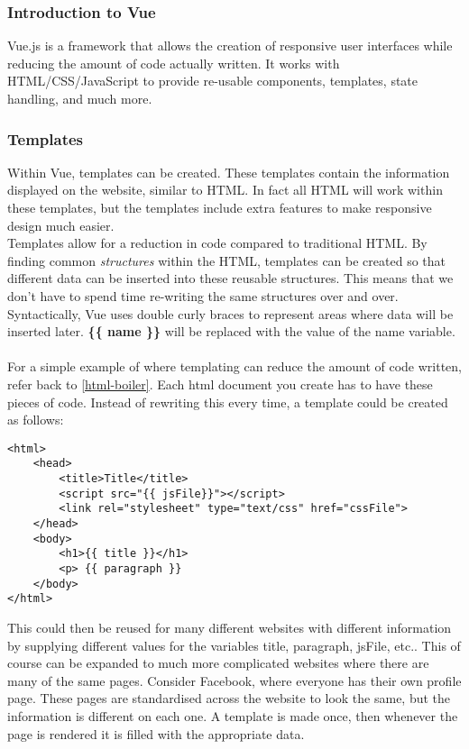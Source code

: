 \documentclass[12pt]{report}
\begin{document}
				\subsubsection{Introduction to Vue}
					Vue.js is a framework that allows the creation of responsive user interfaces while reducing the amount of code actually written. It works with HTML/CSS/JavaScript to provide re-usable components, templates, state handling, and much more. \autocite{vue}\\

				\subsubsection{Templates}
					Within Vue, templates can be created. These templates contain the information displayed on the website, similar to HTML. In fact all HTML will work within these templates, but the templates include extra features to make responsive design much easier.  \\

					Templates allow for a reduction in code compared to traditional HTML. By finding common \textit{structures} within the HTML, templates can be created so that different data can be inserted into these reusable structures. This means that we don't have to spend time re-writing the same structures over and over. Syntactically, Vue uses double curly braces to represent areas where data will be inserted later. \textbf{\{\{ name \}\}} will be replaced with the value of the name variable.\\ \autocite{vue-template}\\

					For a simple example of where templating can reduce the amount of code written, refer back to \ref{html-boiler}. Each html document you create has to have these pieces of code. Instead of rewriting this every time,  a template could be created as follows:\\

					\begin{lstlisting}
<html>
	<head>
		<title>Title</title>
		<script src="{{ jsFile}}"></script>
		<link rel="stylesheet" type="text/css" href="cssFile">
	</head>
	<body>
		<h1>{{ title }}</h1>
		<p> {{ paragraph }}
	</body>
</html>
					\end{lstlisting}

					\vspace{0.5cm}

					This could then be reused for many different websites with different information by supplying different values for the variables title, paragraph, jsFile, etc.. This of course can be expanded to much more complicated websites where there are many of the same pages. Consider Facebook, where everyone has their own profile page. These pages are standardised across the website to look the same, but the information is different on each one. A template is made once, then whenever the page is rendered it is filled with the appropriate data.\\
\end{document}
